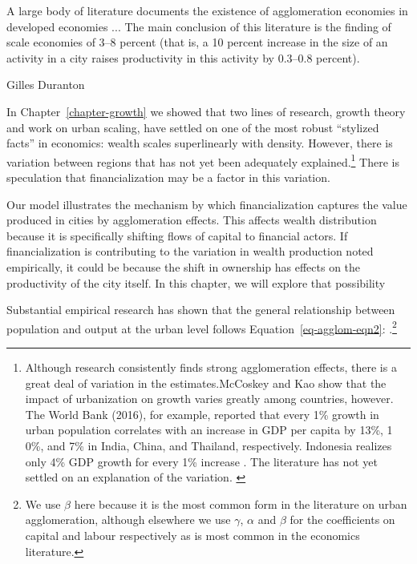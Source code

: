 \epigraph{A large body of literature documents the existence of agglomeration economies in developed economies ... The main conclusion of this literature is the finding of scale economies of 3--8 percent (that is, a 10 percent increase in the size of an activity in a city raises productivity in this activity by 0.3--0.8 percent).}{Gilles Duranton \cite{durantonAreCitiesEngines2009}} %





{\color{black} In Chapter~\ref{chapter-growth} we showed that two lines of research, growth theory and work on urban scaling, have settled on one of the most robust ``stylized facts'' in economics: wealth scales superlinearly with density. However, there is variation between regions that has not yet been adequately explained.\footnote{Although research consistently finds strong agglomeration effects, there is a great deal of variation in the estimates.McCoskey and Kao \cite{mccoskeyPanelDataInvestigation} show that the impact of urbanization on growth varies greatly among countries, however. The World Bank (2016), for example, reported that every 1\% growth in urban population correlates with an increase in GDP per capita by 13\%, 1
0\%, and 7\% in India, China, and Thailand, respectively. Indonesia realizes only 4\% GDP growth for every 1\% increase \cite{haryantotriRelationshipUrbanizationEducation2021}.  The literature has not yet settled on an explanation of the variation.  \cite{loboUrbanScalingProduction2013, pugaMagnitudeCausesAgglomeration2010} } There is speculation that financialization may be a factor in this variation. 

Our model illustrates the mechanism by which financialization captures the value produced in cities by agglomeration effects. This affects wealth distribution because it is specifically shifting flows of capital to financial actors. If financialization is contributing to the variation in wealth production noted empirically, it could be because the shift in ownership has effects on the productivity of the city itself. In this chapter, we will explore that possibility}

Substantial empirical research has shown that the general relationship  between population and output at the urban level %
follows Equation~\ref{eq-agglom-eqn2}: \cite{loboUrbanScalingProduction2013}.\footnote{We use $\beta$ here because it is the most common form in the literature on urban agglomeration, although elsewhere we use $\gamma$, $\alpha$ and $\beta$ for the coefficients on capital and labour respectively as is most common in the economics literature.}

